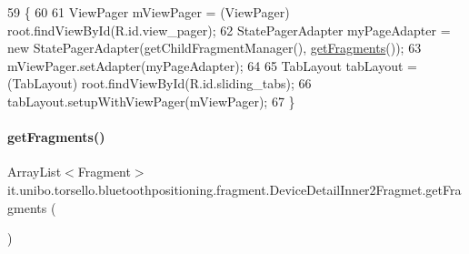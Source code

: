\begin{DoxyCode}
59                                              \{
60 
61         ViewPager mViewPager = (ViewPager) root.findViewById(R.id.view\_pager);
62         StatePagerAdapter myPageAdapter = \textcolor{keyword}{new} StatePagerAdapter(getChildFragmentManager(), 
      \hyperlink{classit_1_1unibo_1_1torsello_1_1bluetoothpositioning_1_1fragment_1_1DeviceDetailInner2Fragmet_adc5cddae8abe48105c75060b99937b62_adc5cddae8abe48105c75060b99937b62}{getFragments}());
63         mViewPager.setAdapter(myPageAdapter);
64 
65         TabLayout tabLayout = (TabLayout) root.findViewById(R.id.sliding\_tabs);
66         tabLayout.setupWithViewPager(mViewPager);
67     \}
\end{DoxyCode}
\hypertarget{classit_1_1unibo_1_1torsello_1_1bluetoothpositioning_1_1fragment_1_1DeviceDetailInner2Fragmet_adc5cddae8abe48105c75060b99937b62_adc5cddae8abe48105c75060b99937b62}{}\label{classit_1_1unibo_1_1torsello_1_1bluetoothpositioning_1_1fragment_1_1DeviceDetailInner2Fragmet_adc5cddae8abe48105c75060b99937b62_adc5cddae8abe48105c75060b99937b62} 
\paragraph{\texorpdfstring{get\+Fragments()}{getFragments()}}
{\footnotesize\ttfamily Array\+List$<$Fragment$>$ it.\+unibo.\+torsello.\+bluetoothpositioning.\+fragment.\+Device\+Detail\+Inner2\+Fragmet.\+get\+Fragments (\begin{DoxyParamCaption}{ }\end{DoxyParamCaption})\hspace{0.3cm}{\ttfamily [private]}}


